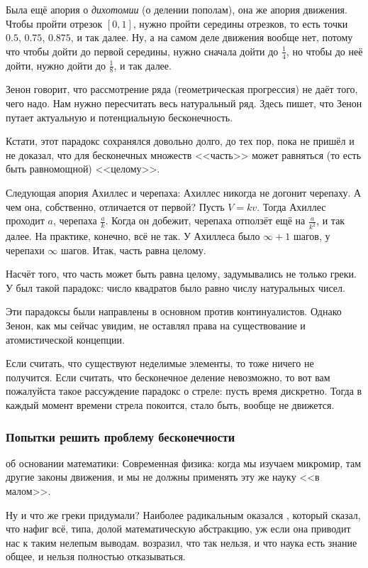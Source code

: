 \documentclass[a4paper,oneside,fleqn,10pt]{article}
\begin{document}
Была ещё апория о \emph{дихотомии} (о делении пополам),  она же апория движения.
Чтобы пройти отрезок $[0,1]$, нужно пройти середины отрезков, то есть точки $0.5$, $0.75$, $0.875$, и так далее.
Ну, а на самом деле движения вообще нет, потому что чтобы дойти до первой середины, нужно сначала
дойти до $\frac14$, но чтобы до неё дойти, нужно дойти до $\frac18$, и так далее.

Зенон говорит, что рассмотрение ряда (геометрическая прогрессия) не даёт того, чего надо. Нам нужно пересчитать
весь натуральный ряд. Здесь  пишет, что Зенон путает актуальную и
потенциальную бесконечность.

Кстати, этот парадокс сохранялся довольно долго, до тех пор, пока не пришёл 
и не доказал, что для бесконечных множеств <<часть>> может равняться (то есть быть равномощной)
<<целому>>.

Следующая апория Ахиллес и черепаха: Ахиллес никогда не догонит черепаху.
А чем она, собственно, отличается от первой? Пусть $V = kv$. Тогда Ахиллес проходит $a$, черепаха $\frac{a}{k}$.
Когда он добежит, черепаха отползёт ещё на $\frac{a}{k^2}$, и так далее.
На практике, конечно, всё не так. У Ахиллеса было $\infty + 1$ шагов,
у черепахи $\infty$ шагов. Итак, часть равна целому.

Насчёт того, что часть может быть равна целому, задумывались не только греки. У  был такой парадокс:
число квадратов было равно числу натуральных чисел.

Эти парадоксы были направлены в основном против континуалистов. Однако Зенон, как мы сейчас увидим, не оставлял права на
существование и атомистической концепции.

Если считать, что существуют неделимые
элементы, то тоже ничего не получится. Если считать, что бесконечное деление невозможно, то вот вам пожалуйста такое рассуждение
парадокс о стреле: пусть время дискретно. Тогда в каждый момент времени стрела
покоится, стало быть, вообще не движется.

\subsubsection{Попытки решить проблему бесконечности}

 об основании математики: Современная физика: когда мы изучаем микромир,
там другие законы движения, и мы не должны применять эту же науку <<в малом>>.

Ну и что же греки придумали?  Наиболее радикальным оказался , который
сказал, что нафиг всё, типа, долой математическую
абстракцию, уж если она приводит нас к таким нелепым выводам.
 возразил, что так нельзя, и что наука есть знание общее, и нельзя полностью
отказываться.
\end{document}
